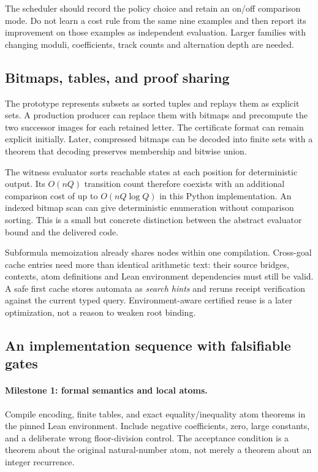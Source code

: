 The scheduler should record the policy choice and retain an on/off comparison mode. Do not learn a cost rule from the same nine examples and then report its improvement on those examples as independent evaluation. Larger families with changing moduli, coefficients, track counts and alternation depth are needed.

\subsection{Bitmaps, tables, and proof sharing}
The prototype represents subsets as sorted tuples and replays them as explicit sets. A production producer can replace them with bitmaps and precompute the two successor images for each retained letter. The certificate format can remain explicit initially. Later, compressed bitmaps can be decoded into finite sets with a theorem that decoding preserves membership and bitwise union.

The witness evaluator sorts reachable states at each position for deterministic output. Its \(O(nQ)\) transition count therefore coexists with an additional comparison cost of up to \(O(nQ\log Q)\) in this Python implementation. An indexed bitmap scan can give deterministic enumeration without comparison sorting. This is a small but concrete distinction between the abstract evaluator bound and the delivered code.

Subformula memoization already shares nodes within one compilation. Cross-goal cache entries need more than identical arithmetic text: their source bridges, contexts, atom definitions and Lean environment dependencies must still be valid. A safe first cache stores automata as \emph{search hints} and reruns receipt verification against the current typed query. Environment-aware certified reuse is a later optimization, not a reason to weaken root binding.

\subsection{An implementation sequence with falsifiable gates}
\paragraph{Milestone 1: formal semantics and local atoms.}
Compile encoding, finite tables, and exact equality/inequality atom theorems in the pinned Lean environment. Include negative coefficients, zero, large constants, and a deliberate wrong floor-division control. The acceptance condition is a theorem about the original natural-number atom, not merely a theorem about an integer recurrence.

